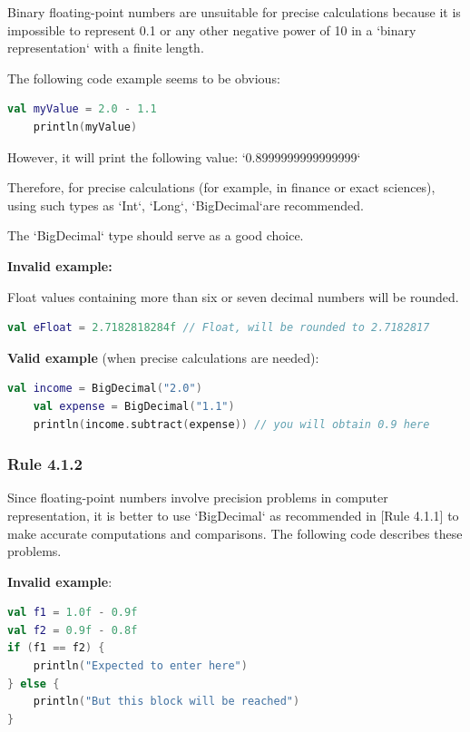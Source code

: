 {{{{Binary floating-point numbers are unsuitable for precise calculations because it is impossible to represent 0.1 or any other negative power of 10 in a `binary representation` with a finite length.



The following code example seems to be obvious:

\begin{lstlisting}[language=Kotlin]
    val myValue = 2.0 - 1.1
    println(myValue)
\end{lstlisting}


However, it will print the following value: `0.8999999999999999`



Therefore, for precise calculations (for example, in finance or exact sciences), using such types as `Int`, `Long`, `BigDecimal`are recommended.

The `BigDecimal` type should serve as a good choice.



\textbf{Invalid example:} \

Float values containing more than six or seven decimal numbers will be rounded.

\begin{lstlisting}[language=Kotlin]
 val eFloat = 2.7182818284f // Float, will be rounded to 2.7182817
\end{lstlisting}


\textbf{Valid example} (when precise calculations are needed):

\begin{lstlisting}[language=Kotlin]
    val income = BigDecimal("2.0")
    val expense = BigDecimal("1.1")
    println(income.subtract(expense)) // you will obtain 0.9 here
\end{lstlisting}


\subsubsection*{\textbf{Rule 4.1.2}}
\leavevmode\newline

Since floating-point numbers involve precision problems in computer representation, it is better to use `BigDecimal` as recommended in [Rule 4.1.1] to make accurate computations and comparisons. The following code describes these problems.



\textbf{Invalid example}:

\begin{lstlisting}[language=Kotlin]
val f1 = 1.0f - 0.9f
val f2 = 0.9f - 0.8f
if (f1 == f2) {
    println("Expected to enter here")
} else {
    println("But this block will be reached")
}


\end{lstlisting}}}}}
